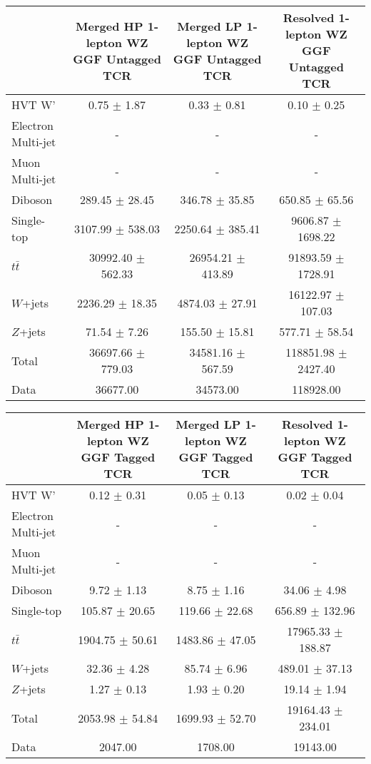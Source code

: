 \begin{tabular}{|l|c|c|c|}
\hline
	  &	Merged HP 1-lepton WZ GGF Untagged TCR &	Merged LP 1-lepton WZ GGF Untagged TCR &	Resolved 1-lepton WZ GGF Untagged TCR \\\hline 
	HVT W' &	0.75 $\pm$ 1.87 &	0.33 $\pm$ 0.81 &	0.10 $\pm$ 0.25 \\\hline 
	Electron Multi-jet &	- &	- &	- \\\hline 
	Muon Multi-jet &	- &	- &	- \\\hline 
	Diboson &	289.45 $\pm$ 28.45 &	346.78 $\pm$ 35.85 &	650.85 $\pm$ 65.56 \\\hline 
	Single-top &	3107.99 $\pm$ 538.03 &	2250.64 $\pm$ 385.41 &	9606.87 $\pm$ 1698.22 \\\hline 
	$t\bar{t}$ &	30992.40 $\pm$ 562.33 &	26954.21 $\pm$ 413.89 &	91893.59 $\pm$ 1728.91 \\\hline 
	$W$+jets &	2236.29 $\pm$ 18.35 &	4874.03 $\pm$ 27.91 &	16122.97 $\pm$ 107.03 \\\hline 
	$Z$+jets &	71.54 $\pm$ 7.26 &	155.50 $\pm$ 15.81 &	577.71 $\pm$ 58.54 \\\hline 
	Total &	36697.66 $\pm$ 779.03 &	34581.16 $\pm$ 567.59 &	118851.98 $\pm$ 2427.40 \\\hline 
	Data &	36677.00 &	34573.00 &	118928.00 \\\hline 
\end{tabular}

\begin{tabular}{|l|c|c|c|}
\hline
	  &	Merged HP 1-lepton WZ GGF Tagged TCR &	Merged LP 1-lepton WZ GGF Tagged TCR &	Resolved 1-lepton WZ GGF Tagged TCR \\\hline 
	HVT W' &	0.12 $\pm$ 0.31 &	0.05 $\pm$ 0.13 &	0.02 $\pm$ 0.04 \\\hline 
	Electron Multi-jet &	- &	- &	- \\\hline 
	Muon Multi-jet &	- &	- &	- \\\hline 
	Diboson &	9.72 $\pm$ 1.13 &	8.75 $\pm$ 1.16 &	34.06 $\pm$ 4.98 \\\hline 
	Single-top &	105.87 $\pm$ 20.65 &	119.66 $\pm$ 22.68 &	656.89 $\pm$ 132.96 \\\hline 
	$t\bar{t}$ &	1904.75 $\pm$ 50.61 &	1483.86 $\pm$ 47.05 &	17965.33 $\pm$ 188.87 \\\hline 
	$W$+jets &	32.36 $\pm$ 4.28 &	85.74 $\pm$ 6.96 &	489.01 $\pm$ 37.13 \\\hline 
	$Z$+jets &	1.27 $\pm$ 0.13 &	1.93 $\pm$ 0.20 &	19.14 $\pm$ 1.94 \\\hline 
	Total &	2053.98 $\pm$ 54.84 &	1699.93 $\pm$ 52.70 &	19164.43 $\pm$ 234.01 \\\hline 
	Data &	2047.00 &	1708.00 &	19143.00 \\\hline 
\end{tabular}

